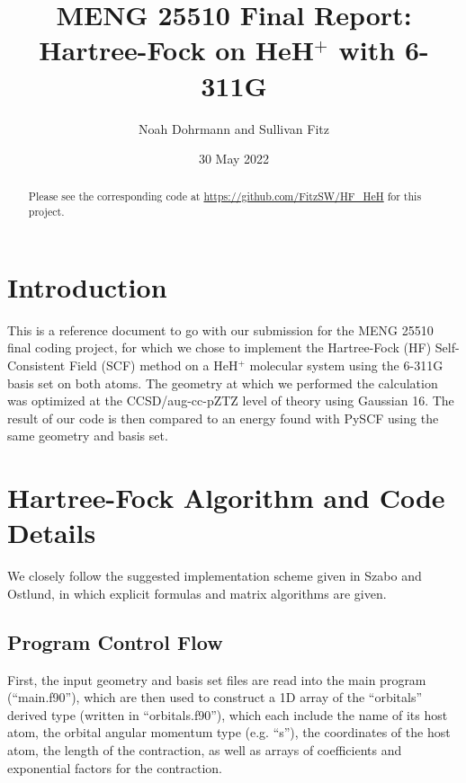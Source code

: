 \documentclass[%
 aip,
 amsmath,amssymb,
 reprint,%
]{revtex4-1}
\begin{document}

\title[MENG 25510 Final]{MENG 25510 Final Report:\\ Hartree-Fock on
HeH$^{+}$ with 6-311G}
\author{Noah Dohrmann and Sullivan Fitz}


\date{30 May 2022}%

\begin{abstract}
Please see the corresponding code at \url{https://github.com/FitzSW/HF_HeH}
for this project.
\end{abstract}

\maketitle

\section{Introduction}
This is a reference document to go with our submission for the MENG 25510
final coding project, for which we chose to implement the Hartree-Fock (HF)
Self-Consistent Field (SCF) method on a HeH$^{+}$ molecular system using the
6-311G basis set on both atoms. The geometry at which we performed the
calculation was optimized at the CCSD/aug-cc-pZTZ level of theory using
Gaussian 16\cite{g16}. The result of our code is then compared to an energy
found with
PySCF\cite{sun2020recent,https://doi.org/10.1002/wcms.1340,https://doi.org/10.1002/jcc.23981}
using the same geometry and basis set.

\section{Hartree-Fock Algorithm and Code Details}
We closely follow the suggested implementation scheme given in Szabo and
Ostlund\cite{szabo2012modern}, in which explicit formulas and matrix
algorithms are given.  

\subsection{Program Control Flow} 
First, the input geometry and basis set files are read into the main program
(``main.f90''), which are then used to construct a 1D array of the
``orbitals'' derived type (written in ``orbitals.f90''), which each include
the name of its host atom, the orbital angular momentum type (e.g. ``s''), the
coordinates of the host atom, the length of the contraction, as well as arrays
of coefficients and exponential factors for the contraction.
\end{document}
